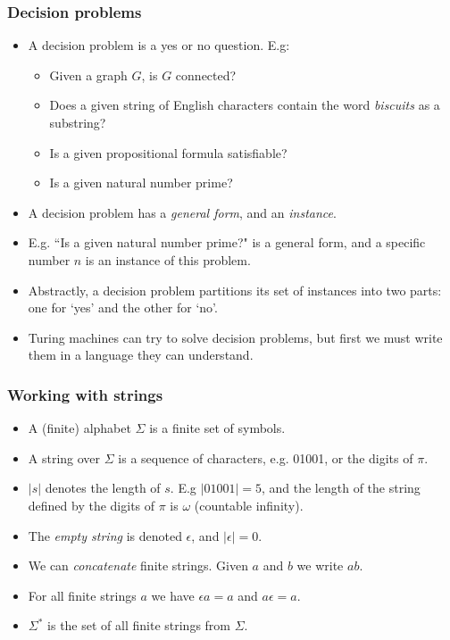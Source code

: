 \documentclass[handout]{beamer}
\begin{document}
\begin{frame}
\frametitle{Decision problems}
\begin{itemize}
\item A decision problem is a yes or no question. E.g:
\begin{itemize}
\item Given a graph $G$, is $G$ connected?
\item Does a given string of English characters contain the word \emph{biscuits} as a substring?
\item Is a given propositional formula satisfiable?
\item Is a given natural number prime?
\end{itemize}
\vspace{0.2cm}
\item A decision problem has a \emph{general form}, and an \emph{instance}. 
\vspace{0.2cm}
\item E.g. ``Is a given natural number prime?" is a general form, and a specific number $n$ is an instance of this problem.
\vspace{0.2cm}
\item Abstractly, a decision problem partitions its set of instances into two parts: one for `yes' and the other for `no'.
\vspace{0.2cm}
\item Turing machines can try to solve decision problems, but first we must write them in a language they can understand.
\end{itemize}
\end{frame}

\begin{frame}
\frametitle{Working with strings}
\begin{itemize}
\item A (finite) alphabet $\Sigma$ is a finite set of symbols.
\vspace{0.2cm}
\item A string over $\Sigma$ is a sequence of characters, e.g. 01001, or the digits of $\pi$.
\vspace{0.2cm}
\item $|s|$ denotes the length of $s$. E.g $|01001|=5$, and the length of the string defined by the digits of $\pi$ is $\omega$ (countable infinity).
\vspace{0.2cm}
\item The \emph{empty string} is denoted $\epsilon$, and $|\epsilon|=0$.
\vspace{0.2cm}
\item We can \emph{concatenate} finite strings. Given $a$ and $b$ we write $ab$.
\vspace{0.2cm}
\item For all finite strings $a$ we have $\epsilon a = a$ and $a\epsilon=a$.
\vspace{0.2cm}
\item $\Sigma^*$ is the set of all finite strings from $\Sigma$.
\end{itemize}
\end{frame}
\end{document}
